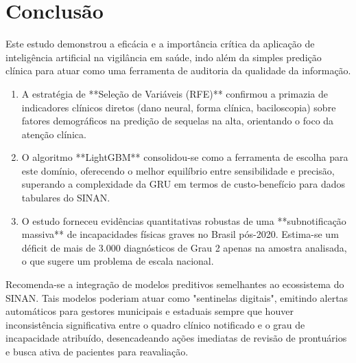 \documentclass[12pt, a4paper]{report}
\begin{document}
\chapter{Conclusão}

Este estudo demonstrou a eficácia e a importância crítica da aplicação de inteligência artificial na vigilância em saúde, indo além da simples predição clínica para atuar como uma ferramenta de auditoria da qualidade da informação.

\begin{enumerate}
    \item A estratégia de **Seleção de Variáveis (RFE)** confirmou a primazia de indicadores clínicos diretos (dano neural, forma clínica, baciloscopia) sobre fatores demográficos na predição de sequelas na alta, orientando o foco da atenção clínica.
    \item O algoritmo **LightGBM** consolidou-se como a ferramenta de escolha para este domínio, oferecendo o melhor equilíbrio entre sensibilidade e precisão, superando a complexidade da GRU em termos de custo-benefício para dados tabulares do SINAN.
    \item O estudo forneceu evidências quantitativas robustas de uma **subnotificação massiva** de incapacidades físicas graves no Brasil pós-2020. Estima-se um déficit de mais de 3.000 diagnósticos de Grau 2 apenas na amostra analisada, o que sugere um problema de escala nacional.
\end{enumerate}

Recomenda-se a integração de modelos preditivos semelhantes ao ecossistema do SINAN. Tais modelos poderiam atuar como "sentinelas digitais", emitindo alertas automáticos para gestores municipais e estaduais sempre que houver inconsistência significativa entre o quadro clínico notificado e o grau de incapacidade atribuído, desencadeando ações imediatas de revisão de prontuários e busca ativa de pacientes para reavaliação.



\end{document}
